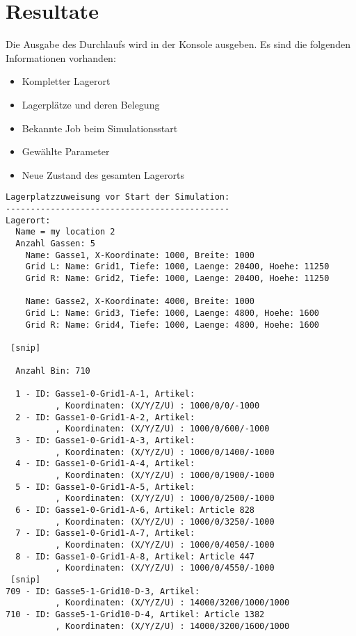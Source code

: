 \section{Resultate}
Die Ausgabe des Durchlaufs wird in der Konsole ausgeben. Es sind die folgenden Informationen vorhanden:
%
\begin{itemize}
  \item Kompletter Lagerort
  \item Lagerplätze und deren Belegung
  \item Bekannte Job beim Simulationsstart
  \item Gewählte Parameter
  \item Neue Zustand des gesamten Lagerorts
\end{itemize}

\begin{verbatim}
Lagerplatzzuweisung vor Start der Simulation:
---------------------------------------------
Lagerort:
  Name = my location 2
  Anzahl Gassen: 5
    Name: Gasse1, X-Koordinate: 1000, Breite: 1000
    Grid L: Name: Grid1, Tiefe: 1000, Laenge: 20400, Hoehe: 11250
    Grid R: Name: Grid2, Tiefe: 1000, Laenge: 20400, Hoehe: 11250

    Name: Gasse2, X-Koordinate: 4000, Breite: 1000
    Grid L: Name: Grid3, Tiefe: 1000, Laenge: 4800, Hoehe: 1600
    Grid R: Name: Grid4, Tiefe: 1000, Laenge: 4800, Hoehe: 1600

 [snip]

  Anzahl Bin: 710

  1 - ID: Gasse1-0-Grid1-A-1, Artikel:            
          , Koordinaten: (X/Y/Z/U) : 1000/0/0/-1000
  2 - ID: Gasse1-0-Grid1-A-2, Artikel:            
          , Koordinaten: (X/Y/Z/U) : 1000/0/600/-1000
  3 - ID: Gasse1-0-Grid1-A-3, Artikel:            
          , Koordinaten: (X/Y/Z/U) : 1000/0/1400/-1000
  4 - ID: Gasse1-0-Grid1-A-4, Artikel:            
          , Koordinaten: (X/Y/Z/U) : 1000/0/1900/-1000
  5 - ID: Gasse1-0-Grid1-A-5, Artikel:            
          , Koordinaten: (X/Y/Z/U) : 1000/0/2500/-1000
  6 - ID: Gasse1-0-Grid1-A-6, Artikel: Article 828
          , Koordinaten: (X/Y/Z/U) : 1000/0/3250/-1000
  7 - ID: Gasse1-0-Grid1-A-7, Artikel:            
          , Koordinaten: (X/Y/Z/U) : 1000/0/4050/-1000
  8 - ID: Gasse1-0-Grid1-A-8, Artikel: Article 447
          , Koordinaten: (X/Y/Z/U) : 1000/0/4550/-1000
 [snip]
709 - ID: Gasse5-1-Grid10-D-3, Artikel:           
          , Koordinaten: (X/Y/Z/U) : 14000/3200/1000/1000
710 - ID: Gasse5-1-Grid10-D-4, Artikel: Article 1382
          , Koordinaten: (X/Y/Z/U) : 14000/3200/1600/1000


\end{verbatim}
